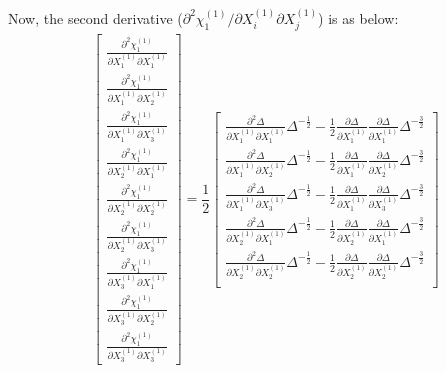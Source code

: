 \documentclass[12pt]{amsart}
\begin{document}
Now, the second derivative ($\partial^2\chi_1^{(1)}/\partial X^{(1)}_i\partial X^{(1)}_j$) is as below:
\begin{equation}
  \label{eq:d2chi_dxdx}
  \begin{split}
    &\begin{bmatrix}
      \frac{\partial^2\chi^{(1)}_1}{\partial X^{(1)}_1\partial X^{(1)}_1}\\
      \frac{\partial^2\chi^{(1)}_1}{\partial X^{(1)}_1\partial X^{(1)}_2}\\
      \frac{\partial^2\chi^{(1)}_1}{\partial X^{(1)}_1\partial X^{(1)}_3}\\
      \frac{\partial^2\chi^{(1)}_1}{\partial X^{(1)}_2\partial X^{(1)}_1}\\
      \frac{\partial^2\chi^{(1)}_1}{\partial X^{(1)}_2\partial X^{(1)}_2}\\
      \frac{\partial^2\chi^{(1)}_1}{\partial X^{(1)}_2\partial X^{(1)}_3}\\
      \frac{\partial^2\chi^{(1)}_1}{\partial X^{(1)}_3\partial X^{(1)}_1}\\
      \frac{\partial^2\chi^{(1)}_1}{\partial X^{(1)}_3\partial X^{(1)}_2}\\
      \frac{\partial^2\chi^{(1)}_1}{\partial X^{(1)}_3\partial X^{(1)}_3}
    \end{bmatrix}
    =\dfrac{1}{2}
    \begin{bmatrix}
      \frac{\partial^2\Delta}{\partial X_1^{(1)} \partial X_1^{(1)}} \Delta^{-\frac{1}{2}} - \frac{1}{2}\frac{\partial\Delta}{\partial X_1^{(1)}} \frac{\partial\Delta}{\partial X_1^{(1)}} \Delta^{-\frac{3}{2}}\\
      \frac{\partial^2\Delta}{\partial X_1^{(1)} \partial X_2^{(1)}} \Delta^{-\frac{1}{2}} - \frac{1}{2}\frac{\partial\Delta}{\partial X_1^{(1)}} \frac{\partial\Delta}{\partial X_2^{(1)}} \Delta^{-\frac{3}{2}}\\
      \frac{\partial^2\Delta}{\partial X_1^{(1)} \partial X_3^{(1)}} \Delta^{-\frac{1}{2}} - \frac{1}{2}\frac{\partial\Delta}{\partial X_1^{(1)}} \frac{\partial\Delta}{\partial X_3^{(1)}} \Delta^{-\frac{3}{2}}\\
      \frac{\partial^2\Delta}{\partial X_2^{(1)} \partial X_1^{(1)}} \Delta^{-\frac{1}{2}} - \frac{1}{2}\frac{\partial\Delta}{\partial X_2^{(1)}} \frac{\partial\Delta}{\partial X_1^{(1)}} \Delta^{-\frac{3}{2}}\\
      \frac{\partial^2\Delta}{\partial X_2^{(1)} \partial X_2^{(1)}} \Delta^{-\frac{1}{2}} - \frac{1}{2}\frac{\partial\Delta}{\partial X_2^{(1)}} \frac{\partial\Delta}{\partial X_2^{(1)}} \Delta^{-\frac{3}{2}}\\

\end{bmatrix}
\end{split}
\end{equation}
\end{document}
